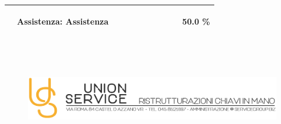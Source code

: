\documentclass[a4paper]{article}
\begin{document}
\begin{tabular}{ | L{6.1mm} |  L{26mm} | L{11mm} |  L{9mm} | L{6.5mm} | L{6.5mm} | L{6.5mm} | L{6.5mm} | L{8mm} | L{7.7mm} | L{16mm} |  }
                        \vspace{2.5mm}\begin{spacing}{0}\end{spacing} &\vspace{2.5mm}\begin{spacing}{0}Assistenza: \newline Assistenza\end{spacing} &\vspace{2.5mm}\begin{spacing}{0}\end{spacing} &\vspace{2.5mm}\begin{spacing}{0}\end{spacing} &\vspace{2.5mm}\begin{spacing}{0}\end{spacing} &\vspace{2.5mm}\begin{spacing}{0}\end{spacing} &\vspace{2.5mm}\begin{spacing}{0}\end{spacing} &\vspace{2.5mm}\begin{spacing}{0}\end{spacing} &\vspace{2.5mm}\begin{spacing}{0}\end{spacing} &\vspace{2.5mm}\begin{spacing}{0}\end{spacing} &\vspace{2.5mm}\begin{spacing}{0}50.0 \%
                            \end{spacing} \\ \hline %
    
                            \end{tabular} \\ \newpage
                                \begin{figure}[!t]
                                \includegraphics[width=15.8cm, height=3cm]{intestazioneAlta2.jpg}
                                \end{figure}
                                
\end{document}
